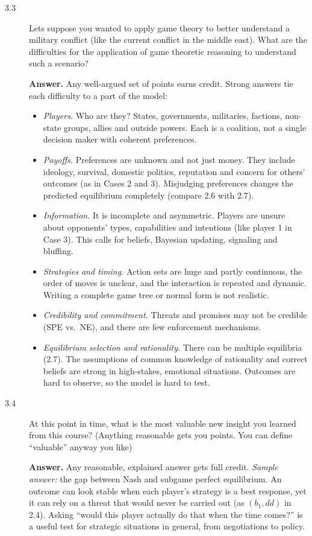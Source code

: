 \documentclass[11pt]{article}
\newenvironment{solution}{\par\smallskip\noindent\textbf{Answer.} }{\par\medskip}
\begin{document}
\begin{description}
\item[3.3] Lets suppose you wanted to apply game theory to better understand a military conflict (like the current conflict in the middle east). What are the difficulties for the application of game theoretic reasoning to understand such a scenario?
\begin{solution}
Any well-argued set of points earns credit. Strong answers tie each difficulty to a part of the model:
\begin{itemize}[itemsep=0pt]
\item \emph{Players.} Who are they? States, governments, militaries, factions, non-state groups, allies and outside powers. Each is a coalition, not a single decision maker with coherent preferences.
\item \emph{Payoffs.} Preferences are unknown and not just money. They include ideology, survival, domestic politics, reputation and concern for others' outcomes (as in Cases 2 and 3). Misjudging preferences changes the predicted equilibrium completely (compare 2.6 with 2.7).
\item \emph{Information.} It is incomplete and asymmetric. Players are unsure about opponents' types, capabilities and intentions (like player 1 in Case 3). This calls for beliefs, Bayesian updating, signaling and bluffing.
\item \emph{Strategies and timing.} Action sets are huge and partly continuous, the order of moves is unclear, and the interaction is repeated and dynamic. Writing a complete game tree or normal form is not realistic.
\item \emph{Credibility and commitment.} Threats and promises may not be credible (SPE vs.\ NE), and there are few enforcement mechanisms.
\item \emph{Equilibrium selection and rationality.} There can be multiple equilibria (2.7). The assumptions of common knowledge of rationality and correct beliefs are strong in high-stakes, emotional situations. Outcomes are hard to observe, so the model is hard to test.
\end{itemize}
\end{solution}

\item[3.4] At this point in time, what is the most valuable new insight you learned from this course? (Anything reasonable gets you points. You can define ``valuable'' anyway you like)
\begin{solution}
Any reasonable, explained answer gets full credit. \emph{Sample answer:} the gap between Nash and subgame perfect equilibrium. An outcome can look stable when each player's strategy is a best response, yet it can rely on a threat that would never be carried out (as $(b_1,dd)$ in 2.4). Asking ``would this player actually do that when the time comes?'' is a useful test for strategic situations in general, from negotiations to policy.
\end{solution}
\end{description}
\end{document}
